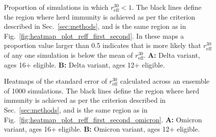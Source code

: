\documentclass[article, a4, authoryear]{elsarticle}
\begin{document}
\begin{figure}[H]
    \centering
    \hfill
    
    \hfill
    \caption{Proportion of simulations in which $r_\mathrm{eff}^{30}<1$. The black lines define the region where herd immunity is achieved as per the criterion described in Sec.~\ref{sec:methods}, and is the same region as in Fig.~\ref{fig:heatmap_plot_reff_first_second}. In these maps a proportion value larger than 0.5 indicates that is more likely that $r_\mathrm{eff}^{30}$ of any one simulation is below the mean of $r_\mathrm{eff}^{30}$. \textbf{A:} Delta variant, ages 16+ eligible. \textbf{B:} Delta variant, ages 12+ eligible.}
    \label{sfig:heatmap_plot_reff_first_second_proportions}
\end{figure}


\begin{figure}[H]
    \centering
    \hfill
    
    \hfill
    \caption{Heatmaps of the standard error of $r_\mathrm{eff}^{30}$ calculated across an ensemble of 1000 simulations. The black lines define the region where herd immunity is achieved as per the criterion described in Sec.~\ref{sec:methods}, and is the same region as in Fig.~\ref{fig:heatmap_plot_reff_first_second_omicron}. \textbf{A:} Omicron variant, ages 16+ eligible. \textbf{B:} Omicron variant, ages 12+ eligible.}
    \label{sfig:heatmap_plot_first_second_sem_omicron}
\end{figure}
  
\end{document}
